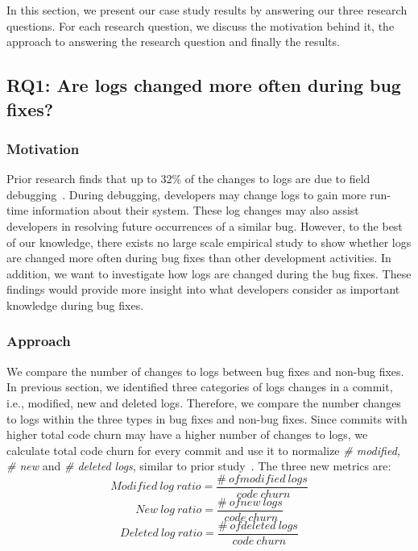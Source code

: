 	In this section, we present our case study results by answering our three research questions. For each research question, we discuss the motivation behind it, the approach to answering the research question and finally the results.

\subsection*{RQ1: Are logs changed more often during bug fixes?}


\subsubsection*{\textbf{Motivation}}

Prior research finds that up to 32\% of the changes to logs are due to field debugging~\cite{EMSEIAN}. During debugging, developers may change logs to gain more run-time information about their system. These log changes may also assist developers in resolving future occurrences of a similar bug. However, to the best of our knowledge, there exists no large scale empirical study to show whether logs are changed more often during bug fixes than other development activities. In addition, we want to investigate how logs are changed during the bug fixes. These findings would provide more insight into what developers consider as important knowledge during bug fixes.

\subsubsection*{\textbf{Approach}}

We compare the number of changes to logs between bug fixes and non-bug fixes. In previous section, we identified three categories of logs changes in a commit, i.e., modified, new and deleted logs. Therefore, we compare the number changes to logs within the three types in bug fixes and non-bug fixes. Since commits with higher total code churn may have a higher number of changes to logs, we calculate total code churn for every commit and use it to normalize \emph{\# modified, \# new} and \emph{\# deleted logs}, similar to prior study~\cite{Characterizinglogs}. The three new metrics are:
\begin{equation}
Modified\ log\ ratio = \frac{\#\ of modified\ logs}{\ code\ churn } 
\label{eq1}
\end{equation}
\begin{equation}
New\ log\  ratio = \frac{\#\ of new\ logs}{\ code\ churn } 
\label{eq2}
\end{equation}
\begin{equation}
Deleted\ log\ ratio = \frac{\#\ of deleted\ logs}{\ code\ churn }
\label{eq3} 
\end{equation}

